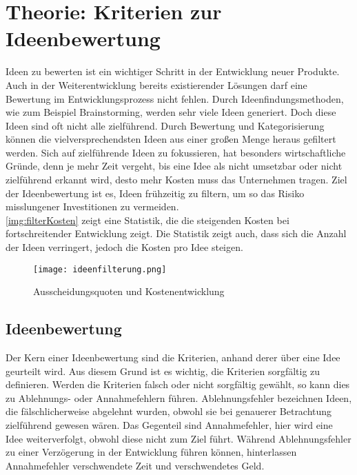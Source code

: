\newpage
\section{Theorie: Kriterien zur Ideenbewertung}\label{sec:theorie}
Ideen zu bewerten ist ein wichtiger Schritt in der Entwicklung neuer Produkte. 
Auch in der Weiterentwicklung bereits existierender Lösungen darf eine Bewertung im Entwicklungsprozess nicht fehlen. 
Durch Ideenfindungsmethoden, wie zum Beispiel Brainstorming, werden sehr viele Ideen generiert. Doch diese Ideen 
sind oft nicht alle zielführend. 
Durch Bewertung und Kategorisierung können die vielversprechendsten Ideen aus einer großen Menge heraus gefiltert werden. 
Sich auf zielführende Ideen zu fokussieren, hat besonders wirtschaftliche Gründe, denn je mehr Zeit vergeht, bis eine Idee 
als nicht umsetzbar oder nicht zielführend erkannt wird, desto mehr Kosten muss das Unternehmen tragen.
Ziel der Ideenbewertung ist es, Ideen frühzeitig zu filtern, um so das Risiko misslungener Investitionen zu vermeiden.
\cite{grossklaus:2008}\\
\autoref{img:filterKosten} zeigt eine Statistik, die die steigenden Kosten bei fortschreitender Entwicklung zeigt. Die
Statistik zeigt auch, dass sich die Anzahl der Ideen verringert, jedoch die Kosten pro Idee steigen.
\begin{figure}[h]
	\centering
	\texttt{[image: ideenfilterung.png]}
	\caption{Ausscheidungsquoten und Kostenentwicklung}
	\label{img:filterKosten}
\end{figure}

\subsection{Ideenbewertung}
Der Kern einer Ideenbewertung sind die Kriterien, anhand derer über eine Idee geurteilt wird.
Aus diesem Grund ist es wichtig, die Kriterien sorgfältig zu definieren. Werden die Kriterien falsch oder nicht sorgfältig gewählt,
so kann dies zu Ablehnungs- oder Annahmefehlern führen. 
Ablehnungsfehler bezeichnen Ideen, die fälschlicherweise abgelehnt wurden, obwohl sie bei genauerer Betrachtung 
zielführend gewesen wären. Das Gegenteil sind Annahmefehler, hier wird eine Idee weiterverfolgt, obwohl diese nicht zum Ziel führt. 
Während Ablehnungsfehler zu einer Verzögerung in der Entwicklung führen können, hinterlassen Annahmefehler verschwendete Zeit und verschwendetes Geld.\\

